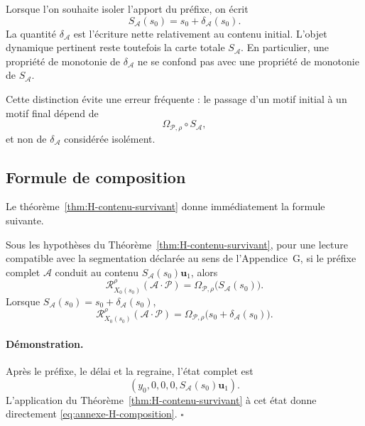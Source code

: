 Lorsque l'on souhaite isoler l'apport du préfixe, on écrit
\begin{equation}
\label{eq:annexe-H-delta}
S_{\mathcal A}(s_0)
=
s_0+\delta_{\mathcal A}(s_0).
\end{equation}
La quantité $\delta_{\mathcal A}$ est l'écriture nette relativement au
contenu initial. L'objet dynamique pertinent reste toutefois la carte
totale $S_{\mathcal A}$. En particulier, une propriété de monotonie de
$\delta_{\mathcal A}$ ne se confond pas avec une propriété de monotonie
de $S_{\mathcal A}$.

Cette distinction évite une erreur fréquente : le passage d'un motif
initial à un motif final dépend de
\[
\Omega_{\mathcal P,\rho}\circ S_{\mathcal A},
\]
et non de $\delta_{\mathcal A}$ considérée isolément.

\subsection{Formule de composition}
\label{annexe-H-formule-composition}

Le théorème~\ref{thm:H-contenu-survivant} donne immédiatement la formule suivante.

\begin{encadre}[title={Corollaire \theproposition{} --- Prédiction d'une sonde après un préfixe éteint}]
Sous les hypothèses du Théorème~\ref{thm:H-contenu-survivant}, pour une lecture compatible avec la
segmentation déclarée au sens de l'Appendice~G, si le préfixe complet
$\mathcal A$ conduit au contenu
$S_{\mathcal A}(s_0)\mathbf u_1$, alors
\begin{equation}
\label{eq:annexe-H-composition}
\boxed{
\mathcal R_{X_0(s_0)}^{\rho}
(\mathcal A\cdot\mathcal P)
=
\Omega_{\mathcal P,\rho}
\bigl(S_{\mathcal A}(s_0)\bigr).
}
\end{equation}
Lorsque $S_{\mathcal A}(s_0)=s_0+\delta_{\mathcal A}(s_0)$,
\[
\mathcal R_{X_0(s_0)}^{\rho}
(\mathcal A\cdot\mathcal P)
=
\Omega_{\mathcal P,\rho}
\bigl(s_0+\delta_{\mathcal A}(s_0)\bigr).
\]
\end{encadre}

\paragraph{Démonstration.}
Après le préfixe, le délai et la regraine, l'état complet est
\[
(y_0,0,0,0,S_{\mathcal A}(s_0)\mathbf u_1).
\]
L'application du Théorème~\ref{thm:H-contenu-survivant} à cet état donne directement
\eqref{eq:annexe-H-composition}. \hfill$\square$

